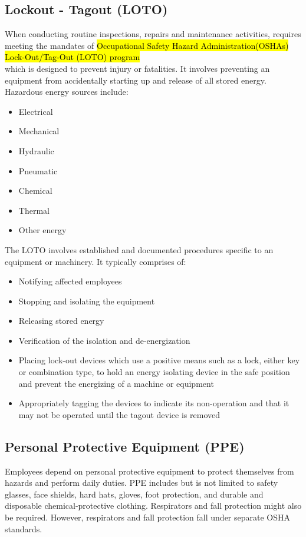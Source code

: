 \subsection{Lockout - Tagout (LOTO)}

When conducting routine inspections, repairs and maintenance activities, requires meeting the mandates of \hl{Occupational Safety  Hazard Administration(OSHAs) Lock-Out/Tag-Out (LOTO) program}\\
which is designed to prevent injury or fatalities.  It involves preventing an equipment from accidentally starting up and release of all stored energy.  Hazardous energy sources include: 
\begin{itemize}
\item Electrical 
\item Mechanical
\item Hydraulic
\item Pneumatic 
\item Chemical 
\item Thermal  
\item Other energy
\end{itemize}

The LOTO involves established and documented procedures specific to an equipment or machinery.  It typically comprises of:\\
\begin{itemize}
\item Notifying affected employees
\item Stopping and isolating the equipment
\item Releasing stored energy
\item Verification of the isolation and de-energization
\item Placing lock-out devices which use a positive means such as a lock, either key or combination type, to hold an energy isolating device in the safe position and prevent the energizing of a machine or equipment
\item Appropriately tagging the devices to indicate its non-operation and that it may not be operated until the tagout device is removed
\end{itemize}

\subsection{Personal Protective Equipment (PPE)}
Employees depend on personal protective equipment to protect themselves from hazards and perform daily duties. PPE includes but is not limited to safety glasses, face shields, hard hats, gloves, foot protection, and durable and disposable chemical-protective clothing. Respirators and fall protection might also be required. However, respirators and fall protection fall under separate OSHA standards. \\

